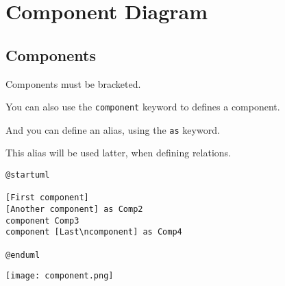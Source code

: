 %
%
% 
%
%
%
%
%
% 

\section{Component Diagram}

\subsection{Components}

\begin{description}
\item Components must be bracketed.
\item You can also use the \texttt{component} keyword to defines a component.
\item And you can define an alias, using the \texttt{as} keyword.
\item This alias will be used latter, when defining relations.
\end{description}

\begin{lstlisting}
@startuml

[First component]
[Another component] as Comp2  
component Comp3
component [Last\ncomponent] as Comp4

@enduml
\end{lstlisting}
\begin{center}
\texttt{[image: component.png]}
\end{center}

